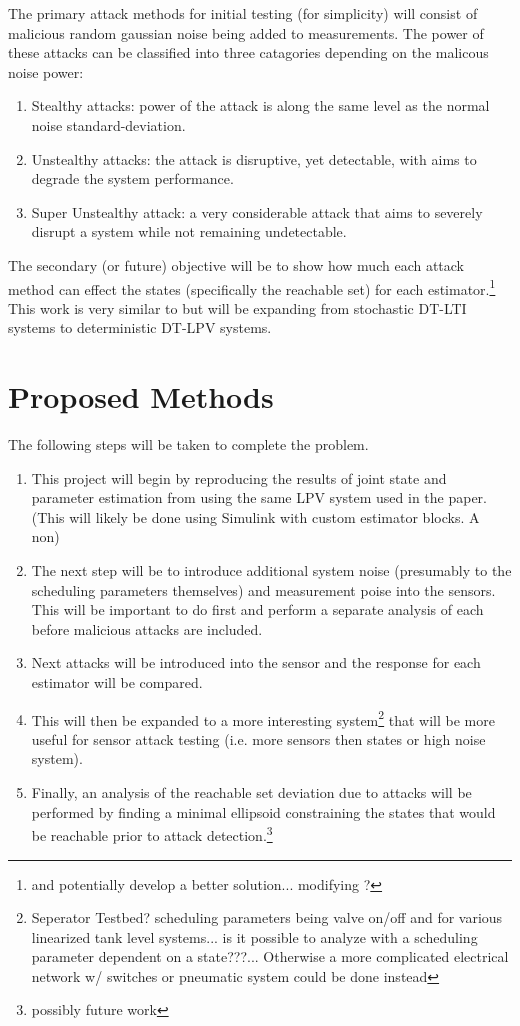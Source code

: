 \documentclass[]{article}
\begin{document}
The primary attack methods for initial testing (for simplicity) will consist of malicious random gaussian noise being added to measurements. The power of these attacks can be classified into three catagories depending on the malicous noise power:
\begin{enumerate}
	\item Stealthy attacks: power of the attack is along the same level as the normal noise standard-deviation.
	\item Unstealthy attacks: the attack is disruptive, yet detectable, with aims to degrade the system performance.
	\item Super Unstealthy attack: a very considerable attack that aims to severely disrupt a system while not remaining undetectable.
\end{enumerate}

The secondary (or future) objective will be to show how much each attack method can effect the states (specifically the reachable set) for each estimator.\footnote{and potentially develop a better solution... modifying \cite{securestateestimation}?} This work is very similar to \cite{hashemi2018comparison} but will be expanding from stochastic DT-LTI systems to deterministic DT-LPV systems.

\section{Proposed Methods}
The following steps will be taken to complete the problem.

\begin{enumerate}
	\item This project will begin by reproducing the results of joint state and parameter estimation from \cite{beelen2017joint} using the same LPV system used in the paper. (This will likely be done using Simulink with custom estimator blocks. A non)
	\item The next step will be to introduce additional system noise (presumably to the scheduling parameters themselves) and measurement poise into the sensors. This will be important to do first and perform a separate analysis of each before malicious attacks are included.
	\item Next attacks will be introduced into the sensor and the response for each estimator will be compared.
	\item This will then be expanded to a more interesting system\footnote{Seperator Testbed? scheduling parameters being valve on/off and for various linearized tank level systems... is it possible to analyze with a scheduling parameter dependent on a state???... Otherwise a more complicated electrical network w/ switches or pneumatic system could be done instead} that will be more useful for sensor attack testing (i.e. more sensors then states or high noise system).
	\item Finally, an analysis of the reachable set deviation due to attacks will be performed by finding a minimal ellipsoid constraining the states that would be reachable prior to attack detection.\footnote{possibly future work}
\end{enumerate}

\newpage


\end{document}
